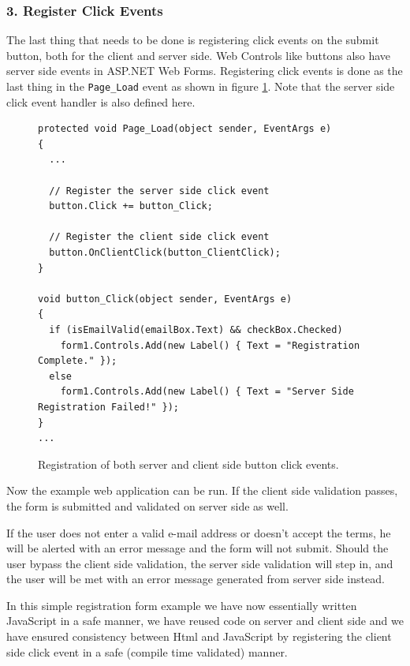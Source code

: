 \subsubsection{3. Register Click Events} %
\label{ssub:3_register_click_events}
	The last thing that needs to be done is registering click events on the submit button, both for the client and server side. Web Controls like buttons also have server side events in ASP.NET Web Forms. Registering click events is done as the last thing in the \texttt{Page\_Load} event as shown in figure \ref{fig:register_events}. Note that the server side click event handler is also defined here.
\begin{figure}[H]
\begin{lstlisting}[language=CSharp,classoffset=1,morekeywords={Default,MiCSPage,Button,CheckBox,TextBox,EventArgs,ClientSide,InputElement,Document,CheckBoxElement,Window,MixedSide,Regex}]
protected void Page_Load(object sender, EventArgs e)
{
  ...

  // Register the server side click event
  button.Click += button_Click;

  // Register the client side click event
  button.OnClientClick(button_ClientClick);
}

void button_Click(object sender, EventArgs e)
{
  if (isEmailValid(emailBox.Text) && checkBox.Checked)
    form1.Controls.Add(new Label() { Text = "Registration Complete." });
  else
    form1.Controls.Add(new Label() { Text = "Server Side Registration Failed!" });
}
...
\end{lstlisting}
\caption{Registration of both server and client side button click events.}
\label{fig:register_events}
\end{figure}



Now the example web application can be run. If the client side validation passes, the form is submitted and validated on server side as well.

If the user does not enter a valid e-mail address or doesn't accept the terms, he will be alerted with an error message and the form will not submit. Should the user bypass the client side validation, the server side validation will step in, and the user will be met with an error message generated from server side instead.

In this simple registration form example we have now essentially written JavaScript in a safe manner, we have reused code on server and client side and we have ensured consistency between Html and JavaScript by registering the client side click event in a safe (compile time validated) manner.

